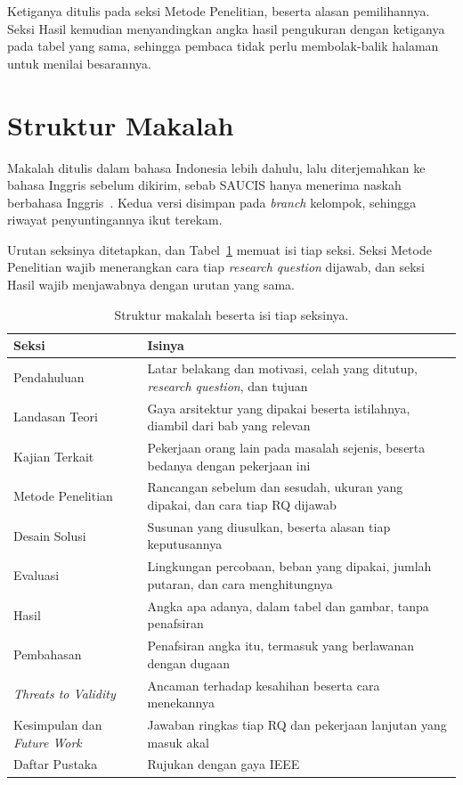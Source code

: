 Ketiganya ditulis pada seksi Metode Penelitian, beserta alasan pemilihannya.
Seksi Hasil kemudian menyandingkan angka hasil pengukuran dengan ketiganya
pada tabel yang sama, sehingga pembaca tidak perlu membolak-balik halaman untuk
menilai besarannya.

\section{Struktur Makalah}

Makalah ditulis dalam bahasa Indonesia lebih dahulu, lalu diterjemahkan ke
bahasa Inggris sebelum dikirim, sebab SAUCIS hanya menerima naskah berbahasa
Inggris~\cite{saucis2026rules}. Kedua versi disimpan pada \textit{branch}
kelompok, sehingga riwayat penyuntingannya ikut terekam.

Urutan seksinya ditetapkan, dan Tabel~\ref{tab:struktur-makalah} memuat isi
tiap seksi. Seksi Metode Penelitian wajib menerangkan cara tiap \textit{research
question} dijawab, dan seksi Hasil wajib menjawabnya dengan urutan yang sama.

\begin{table}[htbp]
  \centering
  \caption{Struktur makalah beserta isi tiap seksinya.}
  \label{tab:struktur-makalah}
  \begin{tabularx}{\textwidth}{|l|X|}
    \hline
    \textbf{Seksi} & \textbf{Isinya} \\
    \hline
    Pendahuluan & Latar belakang dan motivasi, celah yang ditutup, \textit{research question}, dan tujuan \\
    \hline
    Landasan Teori & Gaya arsitektur yang dipakai beserta istilahnya, diambil dari bab yang relevan \\
    \hline
    Kajian Terkait & Pekerjaan orang lain pada masalah sejenis, beserta bedanya dengan pekerjaan ini \\
    \hline
    Metode Penelitian & Rancangan sebelum dan sesudah, ukuran yang dipakai, dan cara tiap RQ dijawab \\
    \hline
    Desain Solusi & Susunan yang diusulkan, beserta alasan tiap keputusannya \\
    \hline
    Evaluasi & Lingkungan percobaan, beban yang dipakai, jumlah putaran, dan cara menghitungnya \\
    \hline
    Hasil & Angka apa adanya, dalam tabel dan gambar, tanpa penafsiran \\
    \hline
    Pembahasan & Penafsiran angka itu, termasuk yang berlawanan dengan dugaan \\
    \hline
    \textit{Threats to Validity} & Ancaman terhadap kesahihan beserta cara menekannya \\
    \hline
    Kesimpulan dan \textit{Future Work} & Jawaban ringkas tiap RQ dan pekerjaan lanjutan yang masuk akal \\
    \hline
    Daftar Pustaka & Rujukan dengan gaya IEEE \\
    \hline
  \end{tabularx}
\end{table}

